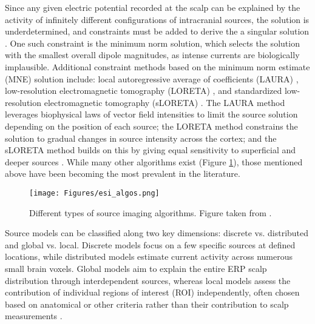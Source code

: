 Since any given electric potential recorded at the scalp can be explained by the activity of infinitely different configurations of intracranial sources, the solution is underdetermined, and constraints must be added to derive the a singular solution \cite{michelEEGSourceImaging2019}. One such constraint is the minimum norm solution, which selects the solution with the smallest overall dipole magnitudes, as intense currents are biologically implausible. Additional constraint methods based on the minimum norm estimate (MNE) solution \cite{hamalainenInterpretingMagneticFields1994} include: local autoregressive average of coefficients (LAURA) \cite{gravedeperaltamenendezElectricalNeuroimagingBased2004a}, low-resolution electromagnetic tomography (LORETA) \cite{pascual-marquiLowResolutionElectromagnetic1994}, and standardized low-resolution electromagnetic tomography (sLORETA) \cite{pascual-marquiStandardizedLowresolutionBrain2002}. The LAURA method leverages biophysical laws of vector field intensities to limit the source solution depending on the position of each source; the LORETA method constrains the solution to gradual changes in source intensity across the cortex; and the sLORETA method builds on this by giving equal sensitivity to superficial and deeper sources \cite{bailletElectromagneticBrainMapping2001, luckIntroductionEventrelatedPotential2014, zorzosAdvancesElectricalSource2021}. While many other algorithms exist (Figure \ref{fig:esi_algo}), those mentioned above have been becoming the most prevalent in the literature.

\begin{figure}[H]
	\centering
	\texttt{[image: Figures/esi\_algos.png]}
	\caption{Different types of source imaging algorithms. Figure taken from \cite{nidalEEGERPAnalysis2014}. \label{fig:esi_algo}}
\end{figure}

Source models can be classified along two key dimensions: discrete vs. distributed and global vs. local. Discrete models focus on a few specific sources at defined locations, while distributed models estimate current activity across numerous small brain voxels. Global models aim to explain the entire ERP scalp distribution through interdependent sources, whereas local models assess the contribution of individual regions of interest (ROI) independently, often chosen based on anatomical or other criteria rather than their contribution to scalp measurements \cite{osmanERPSourceLocalization2007}.


